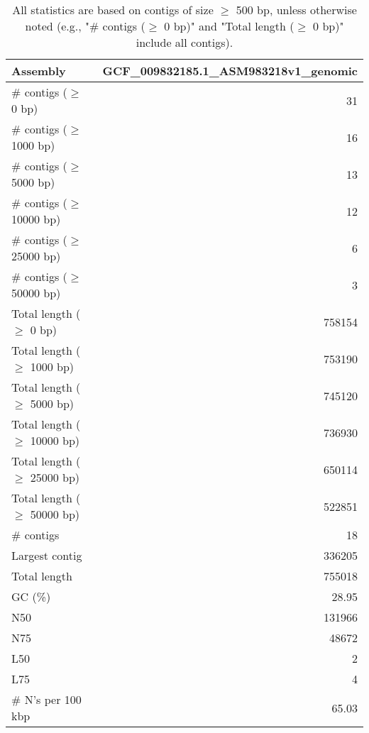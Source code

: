 \documentclass[12pt,a4paper]{article}
\begin{document}
\begin{table}[ht]
\begin{center}
\caption{All statistics are based on contigs of size $\geq$ 500 bp, unless otherwise noted (e.g., "\# contigs ($\geq$ 0 bp)" and "Total length ($\geq$ 0 bp)" include all contigs).}
\begin{tabular}{|l*{1}{|r}|}
\hline
Assembly & GCF\_009832185.1\_ASM983218v1\_genomic \\ \hline
\# contigs ($\geq$ 0 bp) & 31 \\ \hline
\# contigs ($\geq$ 1000 bp) & 16 \\ \hline
\# contigs ($\geq$ 5000 bp) & 13 \\ \hline
\# contigs ($\geq$ 10000 bp) & 12 \\ \hline
\# contigs ($\geq$ 25000 bp) & 6 \\ \hline
\# contigs ($\geq$ 50000 bp) & 3 \\ \hline
Total length ($\geq$ 0 bp) & 758154 \\ \hline
Total length ($\geq$ 1000 bp) & 753190 \\ \hline
Total length ($\geq$ 5000 bp) & 745120 \\ \hline
Total length ($\geq$ 10000 bp) & 736930 \\ \hline
Total length ($\geq$ 25000 bp) & 650114 \\ \hline
Total length ($\geq$ 50000 bp) & 522851 \\ \hline
\# contigs & 18 \\ \hline
Largest contig & 336205 \\ \hline
Total length & 755018 \\ \hline
GC (\%) & 28.95 \\ \hline
N50 & 131966 \\ \hline
N75 & 48672 \\ \hline
L50 & 2 \\ \hline
L75 & 4 \\ \hline
\# N's per 100 kbp & 65.03 \\ \hline
\end{tabular}
\end{center}
\end{table}
\end{document}
